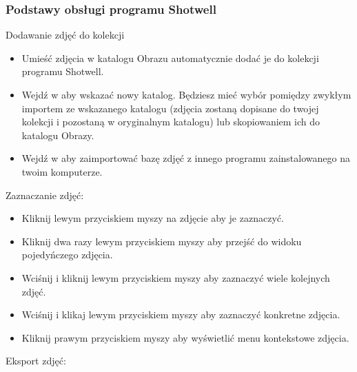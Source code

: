 \subsubsection{Podstawy obsługi programu Shotwell}
Dodawanie zdjęć do kolekcji
\begin{itemize}
\item Umieść zdjęcia w katalogu Obrazu automatycznie dodać je do kolekcji programu Shotwell.
\item Wejdź w  aby wskazać nowy katalog. Będziesz mieć wybór pomiędzy zwykłym importem ze wskazanego katalogu (zdjęcia zostaną dopisane do twojej kolekcji i pozostaną w oryginalnym katalogu) lub skopiowaniem ich do katalogu Obrazy.
\item Wejdź w  aby zaimportować bazę zdjęć z innego programu zainstalowanego na twoim komputerze.
\end{itemize}
Zaznaczanie zdjęć:
\begin{itemize}
\item Kliknij lewym przyciskiem myszy na zdjęcie aby je zaznaczyć.
\item Kliknij dwa razy lewym przyciskiem myszy aby przejść do widoku pojedyńczego zdjęcia.
\item Wciśnij  i kliknij lewym przyciskiem myszy aby zaznaczyć wiele kolejnych zdjęć.
\item Wciśnij  i klikaj lewym przyciskiem myszy aby zaznaczyć konkretne zdjęcia.
\item Kliknij prawym przyciskiem myszy aby wyświetlić menu kontekstowe zdjęcia.
\end{itemize}
Eksport zdjęć:
